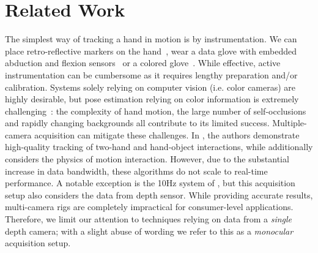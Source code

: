 


\section{Related Work}
\label{sec:related}

The simplest way of tracking a hand in motion is by instrumentation. We can place retro-reflective markers on the hand~\cite{zhao2012marker}, wear a data glove with embedded abduction and flexion sensors~\cite{dipietro2008survey} or a colored glove~\cite{wang2009colorglove}. While effective, active instrumentation can be cumbersome as it requires lengthy preparation and/or calibration. Systems solely relying on computer vision (i.e. color cameras) are highly desirable, but pose estimation  relying on color information is extremely challenging~\cite{erol2007survey}: the complexity of hand motion, the large number of self-occlusions and rapidly changing backgrounds all contribute to its limited success. Multiple-camera acquisition can mitigate these challenges. In \cite{ballan2013salient}, the authors demonstrate high-quality tracking of two-hand and hand-object interactions, while \cite{wang2013physics} additionally considers the physics of motion interaction. However, due to the substantial increase in data bandwidth, these algorithms do not scale to real-time performance. A notable exception is the 10Hz system of  \cite{sridhar2013multicam}, but this acquisition setup also considers the data from depth sensor. While providing accurate results, multi-camera rigs are completely impractical for consumer-level applications. Therefore, we limit our attention to techniques relying on data from a \emph{single} depth camera; with a slight abuse of wording we refer to this as a \emph{monocular} acquisition setup.

